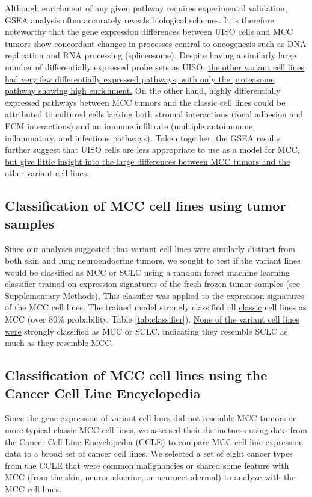 \documentclass[10pt]{article}
\begin{document}
Although enrichment of any given pathway requires experimental validation, GSEA analysis often accurately reveals biological schemes.
It is therefore noteworthy that the gene expression differences between UISO cells and MCC tumors show concordant changes in processes central to oncogenesis such as DNA replication and RNA processing (spliceosome).
Despite having a similarly large number of differentially expressed probe sets as UISO, \uline{the other variant cell lines had very few differentially expressed pathways, with only the proteasome pathway showing high enrichment.}
On the other hand, highly differentially expressed pathways between MCC tumors and the classic cell lines could be attributed to cultured cells lacking both stromal interactions (focal adhesion and ECM interactions) and an immune infiltrate (multiple autoimmune, inflammatory, and infectious pathways).
Taken together, the GSEA results further suggest that UISO cells are less appropriate to use as a model for MCC, \uline{but give little insight into the large differences between MCC tumors and the other variant cell lines.}

\subsection*{Classification of MCC cell lines using tumor samples}
Since our analyses suggested that variant cell lines were similarly distinct from both skin and lung neuroendocrine tumors, we sought to test if the variant lines would be classified as MCC or SCLC using a random forest machine learning classifier trained on expression signatures of the fresh frozen tumor samples (see Supplementary Methods).
This classifier was applied to the expression signatures of the MCC cell lines.
The trained model strongly classified all \uline{classic} cell lines as MCC (over 80\% probability, Table \ref{tab:classifier}). 
\uline{None of the variant cell lines were} strongly classified as MCC or SCLC, indicating they resemble SCLC as much as they resemble MCC.

\subsection*{Classification of MCC cell lines using the Cancer Cell Line Encyclopedia}
Since the gene expression of \uline{variant cell lines} did not resemble MCC tumors or more typical classic MCC cell lines, we assessed their distinctness using data from the Cancer Cell Line Encyclopedia (CCLE)\citep{Barretina2012Cancer} to compare MCC cell line expression data to a broad set of cancer cell lines.
We selected a set of eight cancer types from the CCLE that were common malignancies or shared some feature with MCC (from the skin, neuroendocrine, or neuroectodermal) to analyze with the MCC cell lines.
\end{document}
